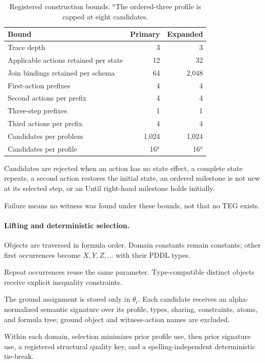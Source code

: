 \begin{table}[htbp]
\centering
\small
\setlength{\tabcolsep}{3pt}
\begin{tabular}{p{}rr}
\toprule
Bound & Primary & Expanded \\
\midrule
Trace depth & 3 & 3 \\
Applicable actions retained per state & 12 & 32 \\
Join bindings retained per schema & 64 & 2,048 \\
First-action prefixes & 4 & 4 \\
Second actions per prefix & 4 & 4 \\
Three-step prefixes & 1 & 1 \\
Third actions per prefix & 4 & 4 \\
Candidates per problem & 1,024 & 1,024 \\
Candidates per profile & 16$^{a}$ & 16$^{a}$ \\
\bottomrule
\end{tabular}
\caption{Registered construction bounds. $^{a}$The ordered-three profile is
capped at eight candidates.}
\label{tab:teg-construction-bounds}
\end{table}

Candidates are rejected when an action has no state effect, a complete state
repeats, a second action restores the initial state, an ordered milestone is
not new at its selected step, or an Until right-hand milestone holds initially.

Failure means no witness was found under these bounds, not that no TEG exists.

\paragraph{Lifting and deterministic selection.}
Objects are traversed in formula order. Domain constants remain constants;
other first occurrences become $X,Y,Z,\ldots$ with their PDDL types.

Repeat occurrences reuse the same parameter. Type-compatible distinct objects
receive explicit inequality constraints.

The ground assignment is stored only in $\theta_i$. Each candidate receives an
alpha-normalized semantic signature over its profile, types, sharing,
constraints, atoms, and formula tree; ground object and witness-action names
are excluded.

Within each domain, selection minimizes prior profile use, then prior signature
use, a registered structural quality key, and a spelling-independent deterministic tie-break.


